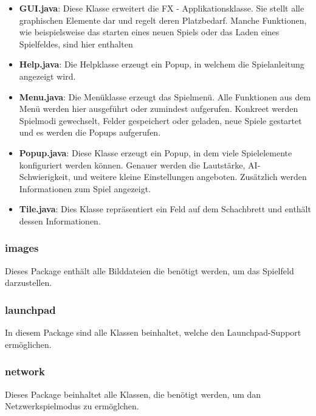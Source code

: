 \documentclass[12pt,a4paper]{article}
\newcommand{\cmnt}[1]{}			%
\begin{document}
{\begin{itemize}
	\item{\textbf{GUI.java}: Diese Klasse erweitert die FX - Applikationsklasse. Sie stellt alle graphischen Elemente dar und regelt deren Platzbedarf. Manche Funktionen, wie beispielsweise das starten eines neuen Spiels oder das Laden eines Spielfeldes, sind hier enthalten }
	
	\item{\textbf{Help.java}: Die Helpklasse erzeugt ein Popup, in welchem die Spielanleitung angezeigt wird.}
	
	\item{\textbf{Menu.java}: Die Menüklasse erzeugt das Spielmenü. Alle Funktionen aus dem Menü werden hier ausgeführt oder zumindest aufgerufen. Konkreet werden Spielmodi gewechselt, Felder gespeichert oder geladen, neue Spiele gestartet und es werden die Popups aufgerufen.}
	
	\item{\textbf{Popup.java}: Diese Klasse erzeugt ein Popup, in dem viele Spielelemente konfiguriert werden können. Genauer werden die Lautstärke, AI-Schwierigkeit, und weitere kleine Einstellungen angeboten. Zusätzlich werden Informationen zum Spiel angezeigt. }
	
	\item{\textbf{Tile.java}: Dies Klasse repräsentiert ein Feld auf dem Schachbrett und enthält dessen Informationen.}

\end{itemize}

\subsubsection{images}

Dieses Package enthält alle Bilddateien die benötigt werden, um das Spielfeld darzustellen. 

\subsubsection{launchpad}

In diesem Package sind alle Klassen beinhaltet, welche den Launchpad-Support ermöglichen. 

\cmnt{TODO Launchpad-Doku}

\subsubsection{network}

Dieses Package beinhaltet alle Klassen, die benötigt werden, um dan Netzwerkspielmodus zu ermöglchen.

}
\end{document}
